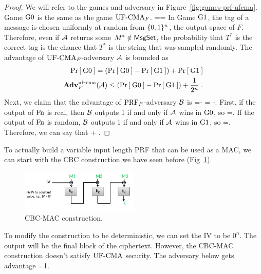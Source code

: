 \begin{proof}
	We will refer to the games and adversary in Figure~\ref{fig:games-prf-ufcma}. Game ${{\textnormal G}}0$ is the same as the game $\textnormal{UF-CMA}_F$.
	\bnm
	==
	\enm
	In Game ${{\textnormal G}}1$, the tag of a message is chosen uniformly at random from $\{0,1\}^n$, the output space of $F$. Therefore, even if ${\mathcal A}$ returns some $M^*\notin \textsf{MsgSet}$, the probability that $T^*$ is the correct tag is the chance that $T^*$ is the string that was sampled randomly.
	\bnm
	\leq {}
	\enm
	The advantage of $\textnormal{UF-CMA}_F$-adversary ${\mathcal A}$ is bounded as
	\begin{align*}
	\Pr\left[\: {{\textnormal G}}0 \:\right]=(\Pr\left[\: {{\textnormal G}}0 \:\right]-\Pr\left[\: {{\textnormal G}}1 \:\right]) + \Pr\left[\: {{\textnormal G}}1 \:\right]\\
	\mathbf{Adv}^{\mathrm{uf\mbox{-} cma}}_{F}({\mathcal A})\leq (\Pr\left[\: {{\textnormal G}}0 \:\right]-\Pr\left[\: {{\textnormal G}}1 \:\right]) + \frac{1}{2^n}\;.
	\end{align*}
	Next, we claim that the advantage of $\textnormal{PRF}_F$-adversary ${\mathcal B}$ is
	\bnm
	 =- = -\;.
	\enm
	First, if the output of $\textnormal{Fn}$ is real, then ${\mathcal B}$ outputs 1 if and only if ${\mathcal A}$ wins in ${{\textnormal G}}0$, so
	\bnm
	=\;.
	\enm
	If the output of $\textnormal{Fn}$ is random, ${\mathcal B}$ outputs 1 if and only if ${\mathcal A}$ wins in ${{\textnormal G}}1$, so 
	\bnm
	=\;.
	\enm
	Therefore, we can say that 
	\bnm
	 \le {} +  \;.
	\enm
\end{proof}

To actually build a variable input length PRF that can be used as a MAC, we can start with the CBC construction we have seen before (Fig~\ref{fig:cbc-mac}).

\begin{figure}
\centering
        \includegraphics[width=0.5\textwidth]{notes/cbc-mac.png}
    \caption{CBC-MAC construction.}
    \label{fig:cbc-mac}
\end{figure}

To modify the construction to be deterministic, we can set the IV to be $0^n$. The output will be the final block of the ciphertext. However, the CBC-MAC construction doesn't satisfy $\textnormal{UF-CMA}$ security. The adversary below gets advantage 
\bnm
\AdvUFCMA{\CBC\text{-}\MAC}{\advA}=1\;.
\enm
\begin{figure}[h]
	\centering
{}
\end{figure}

